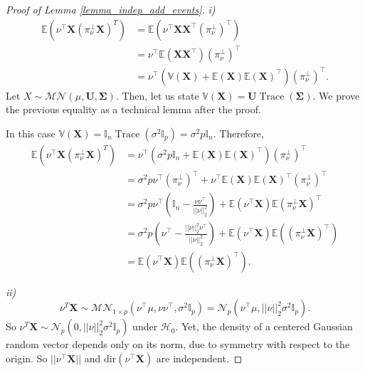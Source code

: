 \documentclass[a4paper,11pt]{article}
\theoremstyle{plain}
\newcommand{\norm}[1]{||#1||}
\newcommand{\1}{\mathbf{1}}
\newcommand{\projnu}{\pi_{\nu}^{\perp}}
\begin{document}
\begin{proof}[Proof of Lemma \ref{lemma_indep_add_events}]
  \textit{i)}
  \begin{equation}
    \begin{aligned}
    \mathbb{E}(\nu^\top\mathbf{X} (\projnu \mathbf{X})^T) &= \mathbb{E}(\nu^\top \mathbf{X} \mathbf{X}^\top (\projnu)^\top) \\
                                                         &= \nu^\top \mathbb{E}(\mathbf{X}\mathbf{X}^\top)(\projnu)^\top \\
                                                         &= \nu^\top(\mathbb{V}(\mathbf{X})+\mathbb{E}(\mathbf{X})\mathbb{E}(\mathbf{X})^\top)(\projnu)^\top.
    \end{aligned}
  \end{equation}
  Let $X \sim \mathcal{MN}(\mu, \mathbf{U}, \mathbf{\Sigma})$. Then, let us state $\mathbb{V}(\mathbf{X}) = \mathbf{U} \operatorname{Trace}(\mathbf{\Sigma})$. We prove the previous equality as a technical lemma after the proof.

    In this case $\mathbb{V}(\mathbf{X}) = \mathbb{I}_n \operatorname{Trace}(\sigma^2\mathbb{I}_p) = \sigma^2 p \mathbb{I}_n$. Therefore,
  \begin{equation}
    \begin{aligned}
      \mathbb{E}(\nu^\top\mathbf{X} (\projnu \mathbf{X})^T) &= \nu^\top(\sigma^2p\mathbb{I}_n + \mathbb{E}(\mathbf{X})\mathbb{E}(\mathbf{X})^\top)(\projnu)^\top \\
                                                            &= \sigma^2 p \nu^\top(\projnu)^\top + \nu^\top \mathbb{E}(\mathbf{X})\mathbb{E}(\mathbf{X})^\top(\projnu)^\top \\
                                                            &= \sigma^2 p \nu^\top(\mathbb{I}_n - \frac{\nu \nu^\top}{\norm{\nu}_2^2}) + \mathbb{E}(\nu^\top \mathbf{X})\mathbb{E}(\projnu \mathbf{X})^\top \\
                                                            &= \sigma^2 p (\nu^\top - \frac{\norm{\nu}_2^2\nu^\top}{\norm{\nu}_2^2}) + \mathbb{E}(\nu^\top \mathbf{X})\mathbb{E}((\projnu \mathbf{X})^\top) \\
                                                            &= \mathbb{E}(\nu^\top \mathbf{X})\mathbb{E}((\projnu \mathbf{X})^\top).
    \end{aligned}
  \end{equation}

  \textit{ii)}
  \begin{equation}
    \nu^T \mathbf{X} \sim \mathcal{MN}_{1 \times p}(\nu^\top\mu, \nu \nu^\top, \sigma^2\mathbb{I}_p)  = \mathcal{N}_p(\nu^\top \mu,\norm{\nu}_2^2\sigma^2 \mathbb{I}_p).
\end{equation}
So $\nu^T \mathbf{X} \sim \mathcal{N}_p(0,\norm{\nu}_2^2\sigma^2\mathbb{I}_p)$ under $\mathcal{H}_0$.
Yet, the density of a centered Gaussian random vector depends only on its norm, due to symmetry with respect to the origin. So $\norm{\nu^\top \mathbf{X}}$ and $\text{dir}(\nu^\top\mathbf{X})$ are independent.


%
%
\end{proof}
\end{document}
